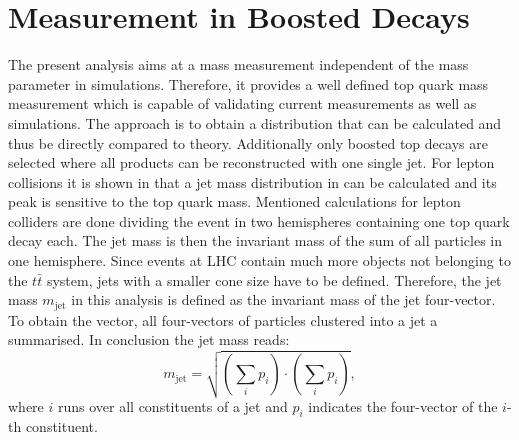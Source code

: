 \section{Measurement in Boosted Decays}
	The present analysis aims at a mass measurement independent of the mass parameter in simulations. Therefore, it provides a well defined top quark mass measurement which is capable of validating current measurements as well as simulations. The approach is to obtain a distribution that can be calculated and thus be directly compared to theory. Additionally only boosted top decays are selected where all products can be reconstructed with one single jet. For lepton collisions it is shown in \cite{eejetmass} that a jet mass distribution in can be calculated and its peak is sensitive to the top quark mass. Mentioned calculations for lepton colliders are done dividing the event in two hemispheres containing one top quark decay each. The jet mass is then the invariant mass of the sum of all particles in one hemisphere. Since events at LHC contain much more objects not belonging to the $t\bar{t}$ system, jets with a smaller cone size have to be defined. Therefore, the jet mass $m_\text{jet}$ in this analysis is defined as the invariant mass of the jet four-vector. To obtain the vector, all four-vectors of particles clustered into a jet a summarised. In conclusion the jet mass reads:
	\begin{equation}
	m_\text{jet} = \sqrt{\left( \sum_{i} p_i \right) \cdot \left( \sum_{i} p_i \right)},
	\end{equation}
	where $i$ runs over all constituents of a jet and $p_i$ indicates the four-vector of the $i$-th constituent. 
	
	


